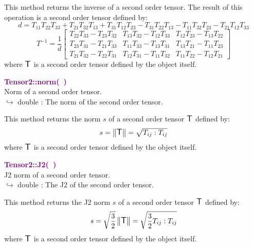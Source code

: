 This method returns the inverse of a second order tensor.
The result of this operation is a second order tensor defined by:
\begin{equation*}
d = T_{11} T_{22} T_{33} + T_{21} T_{32} T_{13} + T_{31} T_{12} T_{23} - T_{31} T_{22} T_{13} - T_{11} T_{32} T_{23} - T_{21} T_{12} T_{33}
\end{equation*}
\begin{equation*}
T^{-1} = \frac {1}{d} \left[\begin{array}{ccc}
  T_{22}T_{33}-T_{23}T_{32}&T_{13}T_{32}-T_{12}T_{33}&T_{12}T_{23}-T_{13}T_{22}\\
  T_{23}T_{31}-T_{21}T_{33}&T_{11}T_{33}-T_{13}T_{31}&T_{13}T_{21}-T_{11}T_{23}\\
  T_{21}T_{32}-T_{22}T_{31}&T_{12}T_{31}-T_{11}T_{32}&T_{11}T_{22}-T_{12}T_{21}
  \end{array}
  \right]
\end{equation*}
where $\mbox{\large\ensuremath{\mathsf{T}}}$ is a second order tensor defined by the object itself.

\textcolor{purple}{\textbf{Tensor2::norm(~)}}\label{Tensor2::norm()}\\
Norm of a second order tensor.\\ \hspace*{10mm}$\hookrightarrow$ double : The norm of the second order tensor.

This method returns the norm $s$ of a second order tensor $\mbox{\large\ensuremath{\mathsf{T}}}$ defined by:\begin{equation*}
s = \left\Vert \mbox{\large\ensuremath{\mathsf{T}}} \right\Vert  = \sqrt {T_{ij}:T_{ij}}
\end{equation*}
where $\mbox{\large\ensuremath{\mathsf{T}}}$ is a second order tensor defined by the object itself.

\textcolor{purple}{\textbf{Tensor2::J2(~)}}\label{Tensor2::J2()}\\
J2 norm of a second order tensor.\\ \hspace*{10mm}$\hookrightarrow$ double : The J2 of the second order tensor.

This method returns the J2 norm $s$ of a second order tensor $\mbox{\large\ensuremath{\mathsf{T}}}$ defined by:
\begin{equation*}
s = \sqrt {\frac{3}{2}} \left\Vert \mbox{\large\ensuremath{\mathsf{T}}} \right\Vert  = \sqrt {\frac{3}{2} T_{ij}:T_{ij}}
\end{equation*}
where $\mbox{\large\ensuremath{\mathsf{T}}}$ is a second order tensor defined by the object itself.


